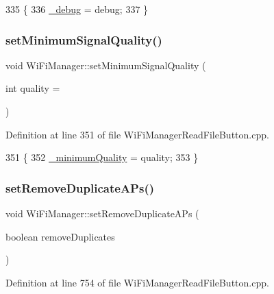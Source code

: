 \begin{DoxyCode}
335                                               \{
336   \hyperlink{class_wi_fi_manager_ac0f345f4a4c8bc38a49c8f87931b8cd4}{\_debug} = debug;
337 \}
\end{DoxyCode}
\mbox{\label{class_wi_fi_manager_a8cc211e7e004a44798d5b422a874f94b}} 
\subsubsection{\texorpdfstring{set\+Minimum\+Signal\+Quality()}{setMinimumSignalQuality()}}
{\footnotesize\ttfamily void Wi\+Fi\+Manager\+::set\+Minimum\+Signal\+Quality (\begin{DoxyParamCaption}\item[{int}]{quality = {} }\end{DoxyParamCaption})}



Definition at line 351 of file Wi\+Fi\+Manager\+Read\+File\+Button.\+cpp.


\begin{DoxyCode}
351                                                      \{
352   \hyperlink{class_wi_fi_manager_ad1e130a5ce502767de764ea0cb1cecf6}{\_minimumQuality} = quality;
353 \}
\end{DoxyCode}
\mbox{\label{class_wi_fi_manager_a4dd1dbf4f22900f226a3897b88155212}} 
\subsubsection{\texorpdfstring{set\+Remove\+Duplicate\+A\+Ps()}{setRemoveDuplicateAPs()}}
{\footnotesize\ttfamily void Wi\+Fi\+Manager\+::set\+Remove\+Duplicate\+A\+Ps (\begin{DoxyParamCaption}\item[{boolean}]{remove\+Duplicates }\end{DoxyParamCaption})}



Definition at line 754 of file Wi\+Fi\+Manager\+Read\+File\+Button.\+cpp.


